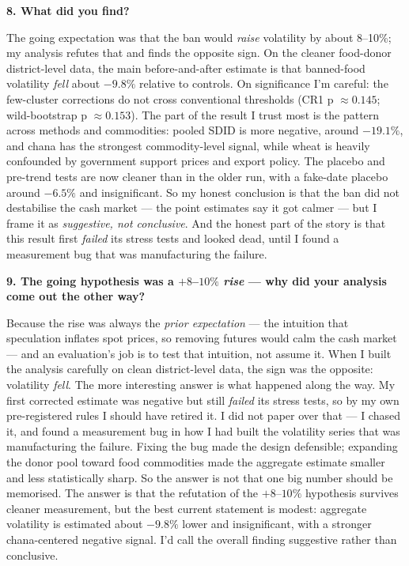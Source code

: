 \documentclass[11pt]{article}
\newcommand{\Q}[1]{\medskip\noindent\textbf{#1}\par}
\newcommand{\A}{\noindent}
\begin{document}
\Q{8. What did you find?}
\A The going expectation was that the ban would \emph{raise} volatility by about 8--10\%; my analysis
refutes that and finds the opposite sign. On the cleaner food-donor district-level data, the main
before-and-after estimate is that banned-food volatility \emph{fell} about $-9.8\%$ relative to
controls. On significance I'm careful: the few-cluster corrections do not cross conventional
thresholds (CR1 p $\approx 0.145$; wild-bootstrap p $\approx 0.153$). The part of the result I trust
most is the pattern across methods and commodities: pooled SDID is more negative, around $-19.1\%$,
and chana has the strongest commodity-level signal, while wheat is heavily confounded by government
support prices and export policy. The placebo and pre-trend tests are now cleaner than in the older
run, with a fake-date placebo around $-6.5\%$ and insignificant. So my honest conclusion is that the
ban did not destabilise the cash market --- the point estimates say it got calmer --- but I frame it
as \emph{suggestive, not
conclusive}. And the honest part of the story is that this result first \emph{failed} its stress
tests and looked dead, until I found a measurement bug that was manufacturing the failure.

\Q{9. The going hypothesis was a $+8$--$10\%$ \emph{rise} --- why did your analysis come out the other way?}
\A Because the rise was always the \emph{prior expectation} --- the intuition that speculation
inflates spot prices, so removing futures would calm the cash market --- and an evaluation's job is
to test that intuition, not assume it. When I built the analysis carefully on clean district-level
data, the sign was the opposite: volatility \emph{fell}. The more interesting answer is what happened
along the way. My first corrected estimate was negative but still \emph{failed} its stress tests, so
by my own pre-registered rules I should have retired it. I did not paper over that --- I chased it,
and found a measurement bug in how I had built the volatility series that was manufacturing the
failure. Fixing the bug made the design defensible; expanding the donor pool toward food commodities
made the aggregate estimate smaller and less statistically sharp. So the answer is not that one big
number should be memorised. The answer is that the refutation of the $+8$--$10\%$ hypothesis survives
cleaner measurement, but the best current statement is modest: aggregate volatility is estimated
about $-9.8\%$ lower and insignificant, with a stronger chana-centered negative signal. I'd call the
overall finding suggestive rather than conclusive.
\end{document}
